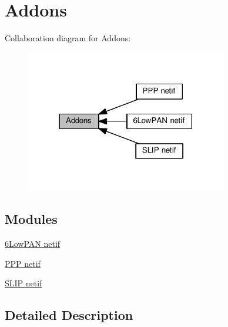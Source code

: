 \hypertarget{group__addons}{}\section{Addons}
\label{group__addons}
Collaboration diagram for Addons\+:
\nopagebreak
\begin{figure}[H]
\begin{center}
\leavevmode
\includegraphics[width=249pt]{group__addons}
\end{center}
\end{figure}
\subsection*{Modules}
\begin{DoxyCompactItemize}
\item 
\hyperlink{group__sixlowpan}{6\+Low\+P\+A\+N netif}
\item 
\hyperlink{group__ppp}{P\+P\+P netif}
\item 
\hyperlink{group__slipif}{S\+L\+I\+P netif}
\end{DoxyCompactItemize}


\subsection{Detailed Description}
